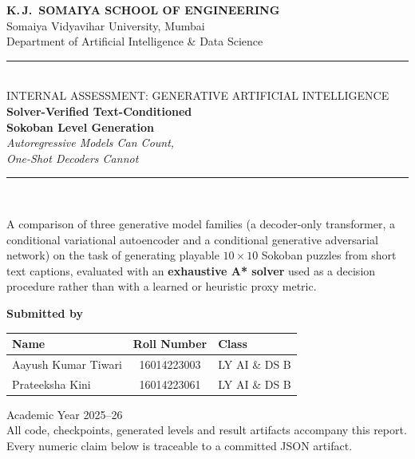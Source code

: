 \documentclass[11pt,a4paper]{report}
\begin{document}
\begin{titlepage}
\centering
\vspace*{0.4cm}

{\sffamily\large\bfseries K.\,J.\ SOMAIYA SCHOOL OF ENGINEERING}\\[3pt]
{\sffamily\normalsize Somaiya Vidyavihar University, Mumbai}\\[4pt]
{\sffamily\small Department of Artificial Intelligence \& Data Science}\\[18pt]

{\color{accent}\rule{\textwidth}{1.2pt}}\\[16pt]

{\sffamily\small\color{rulegrey} INTERNAL ASSESSMENT: GENERATIVE ARTIFICIAL
INTELLIGENCE}\\[20pt]

{\sffamily\LARGE\bfseries Solver-Verified Text-Conditioned\\[6pt]
Sokoban Level Generation}\\[14pt]

{\sffamily\large\itshape Autoregressive Models Can Count,\\ One-Shot Decoders
Cannot}\\[16pt]

{\color{accent}\rule{\textwidth}{1.2pt}}\\[22pt]

\begin{minipage}{0.86\textwidth}
\centering\small
A comparison of three generative model families (a decoder-only
transformer, a conditional variational autoencoder and a conditional
generative adversarial network) on the task of generating playable
$10\times10$ Sokoban puzzles from short text captions, evaluated with an
\textbf{exhaustive A* solver} used as a decision procedure rather than with a
learned or heuristic proxy metric.
\end{minipage}

\vspace{26pt}

{\sffamily\normalsize\bfseries Submitted by}\\[10pt]

\begin{tabular}{@{}l c l@{}}
\toprule
\textbf{Name} & \textbf{Roll Number} & \textbf{Class} \\
\midrule
Aayush Kumar Tiwari & 16014223003 & LY AI \& DS B \\
Prateeksha Kini     & 16014223061 & LY AI \& DS B \\
\bottomrule
\end{tabular}

\vfill

{\small\sffamily Academic Year 2025--26}\\[4pt]
{\footnotesize\sffamily\color{rulegrey}
All code, checkpoints, generated levels and result artifacts accompany this
report.\\
Every numeric claim below is traceable to a committed JSON artifact.}

\end{titlepage}
\end{document}
